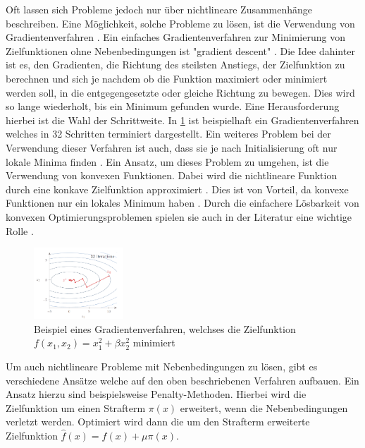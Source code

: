 Oft lassen sich Probleme jedoch nur über nichtlineare Zusammenhänge beschreiben.
Eine Möglichkeit, solche Probleme zu lösen, ist die Verwendung von
Gradientenverfahren \cite[153]{marti21bo}. Ein einfaches Gradientenverfahren zur
Minimierung von Zielfunktionen ohne Nebenbedingungen ist "gradient descent"
\cite[110]{marti21bo}. Die Idee dahinter ist es, den Gradienten, die Richtung
des steilsten Anstiegs, der Zielfunktion zu berechnen und sich je nachdem ob die
Funktion maximiert oder minimiert werden soll, in die entgegengesetzte oder
gleiche Richtung zu bewegen. Dies wird so lange wiederholt, bis ein Minimum
gefunden wurde. Eine Herausforderung hierbei ist die Wahl der Schrittweite. In
\ref*{fig:gradient} ist beispielhaft  ein Gradientenverfahren welches in 32
Schritten terminiert dargestellt. Ein weiteres Problem bei der Verwendung dieser
Verfahren ist auch, dass sie je nach Initialisierung oft nur lokale Minima
finden \cite[9]{boyd04bo}. Ein Ansatz, um dieses Problem zu umgehen, ist die
Verwendung von konvexen Funktionen. Dabei wird die nichtlineare Funktion durch
eine konkave Zielfunktion approximiert \cite[11]{boyd04bo}. Dies ist von
Vorteil, da konvexe Funktionen nur ein lokales Minimum haben
\cite[7]{noced06bo}. Durch die einfachere Lösbarkeit von konvexen
Optimierungsproblemen spielen sie auch in der Literatur eine wichtige Rolle
\cite[8]{boyd04bo}.

\begin{figure}[h]
    \centering
    \includegraphics[width=0.3\textwidth]{figures/[marti21bo Gradient].png}
    \caption{Beispiel eines Gradientenverfahren, welchses die Zielfunktion \\
    $f(x_1,x_2)=x_1^2+\beta x_2^2$ minimiert  \cite[112]{marti21bo}}
    \label{fig:gradient}
\end{figure}

Um auch nichtlineare Probleme mit Nebenbedingungen zu lösen, gibt es
verschiedene Ansätze welche auf den oben beschriebenen Verfahren aufbauen. Ein
Ansatz hierzu sind beispielsweise  Penalty-Methoden. Hierbei wird die
Zielfunktion um einen Strafterm $\pi(x)$ erweitert, wenn die Nebenbedingungen
verletzt werden. Optimiert wird dann die um den Strafterm erweiterte
Zielfunktion $\hat{f}(x)=f(x)+\mu\pi(x)$.
\cite[175]{marti21bo}



